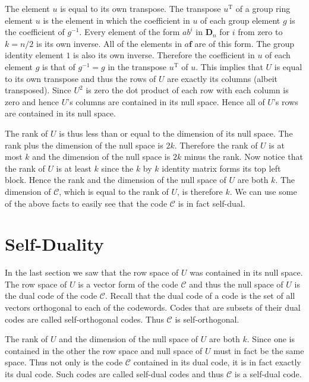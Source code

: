The element $u$ is equal to its own transpose.
The transpose $u^{\textrm{T}}$ of a group ring element $u$ is the element in which the coefficient in $u$ of each group element $g$ is the coefficient of $g^{-1}$.
Every element of the form $ab^i$ in $\mathbf{D}_n$ for $i$ from zero to $k = n/2$ is its own inverse.
All of the elements in $a \mathbf{f}$ are of this form.
The group identity element $1$ is also its own inverse.
Therefore the coefficient in $u$ of each element $g$ is that of $g^{-1} = g$ in the transpose $u^{\textrm{T}}$ of $u$.
This implies that $U$ is equal to its own transpose and thus the rows of $U$ are exactly its columns (albeit transposed).
Since $U^2$ is zero the dot product of each row with each column is zero and hence $U$'s columns are contained in its null space.
Hence all of $U$'s rows are contained in its null space.

The rank of $U$ is thus less than or equal to the dimension of its null space.
The rank plus the dimension of the null space is $2k$.
Therefore the rank of $U$ is at most $k$ and the dimension of the null space is $2k$ minus the rank.
Now notice that the rank of $U$ is at least $k$ since the $k$ by $k$ identity matrix forms its top left block.
Hence the rank and the dimension of the null space of $U$ are both $k$.
The dimension of $\mathcal{C}$, which is equal to the rank of $U$, is therefore $k$.
We can use some of the above facts to easily see that the code $\mathcal{C}$ is in fact self-dual.

\section{Self-Duality}
\label{sect:genselfdual}
In the last section we saw that the row space of $U$ was contained in its null space.
The row space of $U$ is a vector form of the code $\mathcal{C}$ and thus the null space of $U$ is the dual code of the code $\mathcal{C}$.
Recall that the dual code of a code is the set of all vectors orthogonal to each of the codewords.
Codes that are subsets of their dual codes are called self-orthogonal codes.
Thus $\mathcal{C}$ is self-orthogonal.

The rank of $U$ and the dimension of the null space of $U$ are both $k$.
Since one is contained in the other the row space and null space of $U$ must in fact be the same space.
Thus not only is the code $\mathcal{C}$ contained in its dual code, it is in fact exactly its dual code.
Such codes are called self-dual codes and thus $\mathcal{C}$ is a self-dual code.

